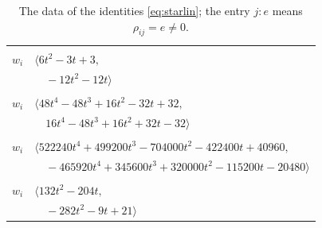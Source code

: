 \documentclass[11pt]{article}
\begin{document}
\begingroup\scriptsize
\setlength{\LTcapwidth}{\textwidth}
\begin{longtable}{@{}ll@{}}
\caption{The data of the identities \eqref{eq:starlin}; the entry $j{:}e$ means $\rho_{ij}=e\neq0$.}\label{tab:star}\\
\hline\endfirsthead\hline\endhead\hline\endfoot
\multicolumn{2}{@{}p{0.97\textwidth}@{}}{$i=0$, $D_i=1$, $\rho_{ij}$: $1{:}3, \allowbreak 8{:}1, \allowbreak 19{:}2, \allowbreak 31{:}3, \allowbreak 41{:}3, \allowbreak 45{:}3, \allowbreak 50{:}2, \allowbreak 59{:}3, \allowbreak 68{:}1, \allowbreak 70{:}3, \allowbreak 72{:}2, \allowbreak 76{:}1$}\\
$w_i$ & $\langle 6t^{2}-3t+3,$\\
 & $\quad -12t^{2}-12t\rangle$\\
\addlinespace[2pt]
\multicolumn{2}{@{}p{0.97\textwidth}@{}}{$i=1$, $D_i=1$, $e_i=2$, $\rho_{ij}$: $0{:}1, \allowbreak 5{:}3, \allowbreak 6{:}1, \allowbreak 7{:}2, \allowbreak 25{:}1, \allowbreak 27{:}2, \allowbreak 29{:}2, \allowbreak 32{:}2, \allowbreak 44{:}2, \allowbreak 56{:}2, \allowbreak 67{:}1, \allowbreak 72{:}2$}\\
$w_i$ & $\langle 48t^{4}-48t^{3}+16t^{2}-32t+32,$\\
 & $\quad 16t^{4}-48t^{3}+16t^{2}+32t-32\rangle$\\
\addlinespace[2pt]
\multicolumn{2}{@{}p{0.97\textwidth}@{}}{$i=2$, $D_i=2$, $e_i=3$, $\rho_{ij}$: $15{:}3, \allowbreak 19{:}3, \allowbreak 22{:}1, \allowbreak 32{:}1, \allowbreak 34{:}3, \allowbreak 35{:}3, \allowbreak 36{:}3, \allowbreak 44{:}3, \allowbreak 45{:}3, \allowbreak 48{:}2, \allowbreak 49{:}2, \allowbreak 50{:}1, \allowbreak 54{:}1, \allowbreak 61{:}1, \allowbreak 63{:}3, \allowbreak 64{:}2, \allowbreak 74{:}1, \allowbreak 77{:}3$}\\
$w_i$ & $\langle 522240t^{4}+499200t^{3}-704000t^{2}-422400t+40960,$\\
 & $\quad -465920t^{4}+345600t^{3}+320000t^{2}-115200t-20480\rangle$\\
\addlinespace[2pt]
\multicolumn{2}{@{}p{0.97\textwidth}@{}}{$i=3$, $D_i=1$, $\rho_{ij}$: $18{:}3, \allowbreak 20{:}3, \allowbreak 21{:}2, \allowbreak 23{:}2, \allowbreak 34{:}3, \allowbreak 41{:}3, \allowbreak 44{:}2, \allowbreak 49{:}1, \allowbreak 52{:}1, \allowbreak 55{:}3, \allowbreak 58{:}3, \allowbreak 59{:}3, \allowbreak 60{:}1, \allowbreak 64{:}1, \allowbreak 69{:}2, \allowbreak 72{:}1$}\\
$w_i$ & $\langle 132t^{2}-204t,$\\
 & $\quad -282t^{2}-9t+21\rangle$\\

\end{longtable}
\end{document}
